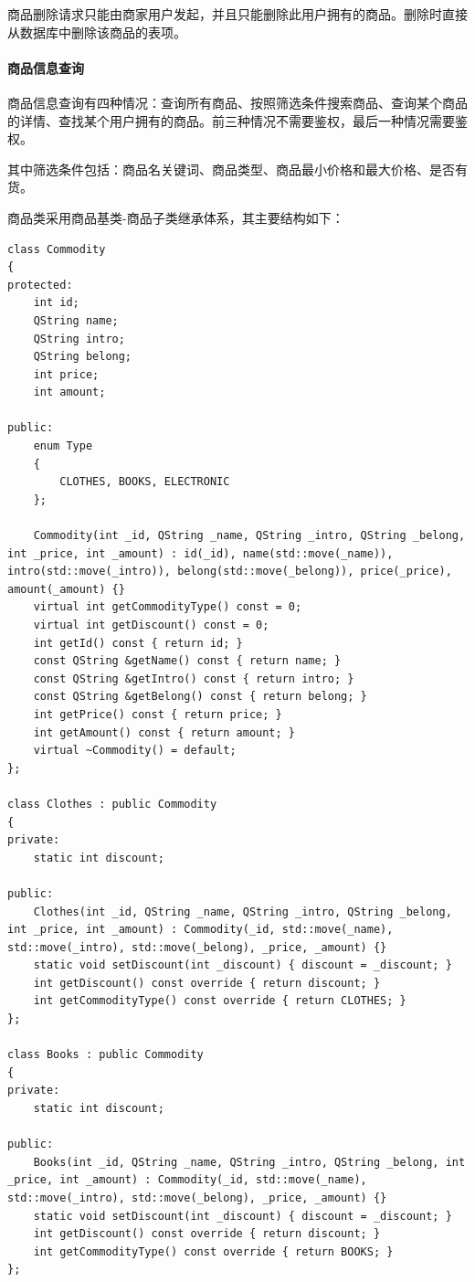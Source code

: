 \documentclass[lang=cn,11pt,a4paper,cite=authornum]{paper}
\begin{document}
商品删除请求只能由商家用户发起，并且只能删除此用户拥有的商品。删除时直接从数据库中删除该商品的表项。

\paragraph{商品信息查询}

商品信息查询有四种情况：查询所有商品、按照筛选条件搜索商品、查询某个商品的详情、查找某个用户拥有的商品。前三种情况不需要鉴权，最后一种情况需要鉴权。

其中筛选条件包括：商品名关键词、商品类型、商品最小价格和最大价格、是否有货。

商品类采用商品基类-商品子类继承体系，其主要结构如下：

\begin{code}
\begin{verbatim}
class Commodity
{
protected:
    int id;
    QString name;
    QString intro;
    QString belong;
    int price; 
    int amount;
 
public:
    enum Type
    {
        CLOTHES, BOOKS, ELECTRONIC
    };
    
    Commodity(int _id, QString _name, QString _intro, QString _belong, int _price, int _amount) : id(_id), name(std::move(_name)), intro(std::move(_intro)), belong(std::move(_belong)), price(_price), amount(_amount) {}
    virtual int getCommodityType() const = 0;
    virtual int getDiscount() const = 0;
    int getId() const { return id; }
    const QString &getName() const { return name; }
    const QString &getIntro() const { return intro; }
    const QString &getBelong() const { return belong; }
    int getPrice() const { return price; }
    int getAmount() const { return amount; }
    virtual ~Commodity() = default;
};
 
class Clothes : public Commodity
{
private:
    static int discount;
 
public:
    Clothes(int _id, QString _name, QString _intro, QString _belong, int _price, int _amount) : Commodity(_id, std::move(_name), std::move(_intro), std::move(_belong), _price, _amount) {}
    static void setDiscount(int _discount) { discount = _discount; }
    int getDiscount() const override { return discount; }
    int getCommodityType() const override { return CLOTHES; }
};
 
class Books : public Commodity
{
private:
    static int discount;
 
public:
    Books(int _id, QString _name, QString _intro, QString _belong, int _price, int _amount) : Commodity(_id, std::move(_name), std::move(_intro), std::move(_belong), _price, _amount) {}
    static void setDiscount(int _discount) { discount = _discount; }
    int getDiscount() const override { return discount; }
    int getCommodityType() const override { return BOOKS; }
};
 

\end{verbatim}
\end{code}
\end{document}
